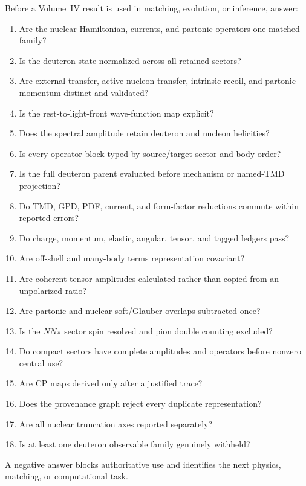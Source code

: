 \documentclass[11pt]{article}
\begin{document}
Before a Volume~IV result is used in matching, evolution, or inference, answer:
\begin{enumerate}
\item Are the nuclear Hamiltonian, currents, and partonic operators one matched
      family?
\item Is the deuteron state normalized across all retained sectors?
\item Are external transfer, active-nucleon transfer, intrinsic recoil, and
      partonic momentum distinct and validated?
\item Is the rest-to-light-front wave-function map explicit?
\item Does the spectral amplitude retain deuteron and nucleon helicities?
\item Is every operator block typed by source/target sector and body order?
\item Is the full deuteron parent evaluated before mechanism or named-TMD
      projection?
\item Do TMD, GPD, PDF, current, and form-factor reductions commute within
      reported errors?
\item Do charge, momentum, elastic, angular, tensor, and tagged ledgers pass?
\item Are off-shell and many-body terms representation covariant?
\item Are coherent tensor amplitudes calculated rather than copied from an
      unpolarized ratio?
\item Are partonic and nuclear soft/Glauber overlaps subtracted once?
\item Is the \(NN\pi\) sector spin resolved and pion double counting excluded?
\item Do compact sectors have complete amplitudes and operators before nonzero
      central use?
\item Are CP maps derived only after a justified trace?
\item Does the provenance graph reject every duplicate representation?
\item Are all nuclear truncation axes reported separately?
\item Is at least one deuteron observable family genuinely withheld?
\end{enumerate}
A negative answer blocks authoritative use and identifies the next physics,
matching, or computational task.
\end{document}
